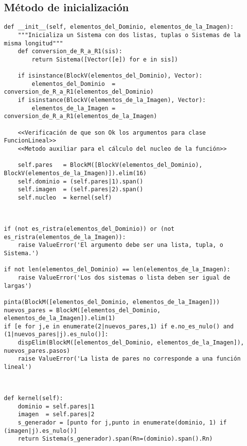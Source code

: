 \documentclass[11pt]{report}
\begin{document}
\subsection{Método de inicialización}
\label{sec:org47d8733}

\begin{verbatim}
def __init__(self, elementos_del_Dominio, elementos_de_la_Imagen):
    """Inicializa un Sistema con dos listas, tuplas o Sistemas de la misma longitud"""
    def conversion_de_R_a_R1(sis):
        return Sistema([Vector([e]) for e in sis])
    
    if isinstance(BlockV(elementos_del_Dominio), Vector):
        elementos_del_Dominio  = conversion_de_R_a_R1(elementos_del_Dominio)
    if isinstance(BlockV(elementos_de_la_Imagen), Vector):
        elementos_de_la_Imagen = conversion_de_R_a_R1(elementos_de_la_Imagen)

    <<Verificación de que son Ok los argumentos para clase FuncionLineal>>
    <<Metodo auxiliar para el cálculo del nucleo de la función>>
            
    self.pares   = BlockM([BlockV(elementos_del_Dominio), BlockV(elementos_de_la_Imagen)]).elim(16)
    self.dominio = (self.pares|1).span()
    self.imagen  = (self.pares|2).span()
    self.nucleo  = kernel(self)
    
\end{verbatim}

\begin{verbatim}

if (not es_ristra(elementos_del_Dominio)) or (not es_ristra(elementos_de_la_Imagen)):
    raise ValueError('El argumento debe ser una lista, tupla, o Sistema.')
        
if not len(elementos_del_Dominio) == len(elementos_de_la_Imagen):
    raise ValueError('Los dos sistemas o lista deben ser igual de largas')

pinta(BlockM([elementos_del_Dominio, elementos_de_la_Imagen]))
nuevos_pares = BlockM([elementos_del_Dominio, elementos_de_la_Imagen]).elim(1)
if [e for j,e in enumerate(2|nuevos_pares,1) if e.no_es_nulo() and (1|nuevos_pares|j).es_nulo()]:
    dispElim(BlockM([elementos_del_Dominio, elementos_de_la_Imagen]), nuevos_pares.pasos)
    raise ValueError('La lista de pares no corresponde a una función lineal')
    
\end{verbatim}

\begin{verbatim}

def kernel(self):
    dominio = self.pares|1 
    imagen  = self.pares|2 
    s_generador = [punto for j,punto in enumerate(dominio, 1) if (imagen|j).es_nulo()]
    return Sistema(s_generador).span(Rn=(dominio).span().Rn)

\end{verbatim}
\end{document}
